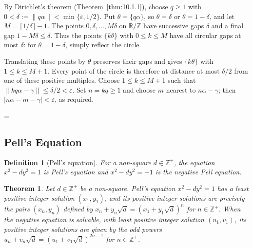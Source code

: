 \documentclass[11pt]{article}
\makeatletter
\theoremstyle{ntstyle}
\newtheorem{theorem}{Theorem}[subsection]
\newtheorem{definition}{Definition}[subsection]
\let\nt@closedisplay\]
\def\nt@guardedclose{\@ifnextchar\par{\nt@closeafterpar}{\@ifnextchar\end{\postdisplaypenalty\@M\nt@closedisplay}{\nt@closedisplay}}}
\def\nt@closeafterpar\par{\@ifnextchar\par{\nt@closeafterpar}{\@ifnextchar\end{\postdisplaypenalty\@M\nt@closedisplay\par}{\nt@closedisplay\par}}}
\renewenvironment{proof}[1][\proofname]{\par
  \pushQED{\qed}\normalfont\topsep\medskipamount\edef\nt@afterproof{\@endparpenalty=\the\@endparpenalty\relax}\@beginparpenalty\@M\@endparpenalty\@M\let\]\nt@guardedclose\trivlist\item[]\textit{#1\@addpunct{.}} \ignorespaces}{\ifvmode\addpenalty\@M\fi\popQED\nt@afterproof\endtrivlist\@endpefalse}
\makeatother
\begin{document}
\begin{proof} By Dirichlet's theorem (Theorem~\ref{thm:10.1.1}),
	choose $q\ge1$ with $0<\delta:=\lVert q\alpha\rVert<\min\{\varepsilon,1/2\}$.
	Put $\theta=\{q\alpha\}$, so $\theta=\delta$ or $\theta=1-\delta$,
	and let $M=\lceil1/\delta\rceil-1$.
	The points $0,\delta,\ldots,M\delta$ on $\mathbb{R}/\mathbb{Z}$
	have successive gaps $\delta$ and a final gap $1-M\delta\le\delta$.
	Thus the points $\{k\theta\}$ with $0\le k\le M$ have all circular gaps
	at most $\delta$: for $\theta=1-\delta$, simply reflect the circle.

	Translating these points by $\theta$ preserves their gaps and gives
	$\{k\theta\}$ with $1\le k\le M+1$. Every point of the circle is
	therefore at distance at most $\delta/2$ from one of these positive
	multiples. Choose $1\le k\le M+1$ such that
	$\lVert kq\alpha-\gamma\rVert\le\delta/2<\varepsilon$.
	Set $n=kq\ge1$ and choose $m$ nearest to $n\alpha-\gamma$; then
	$|n\alpha-m-\gamma|<\varepsilon$, as required.

\end{proof}
\subsection{Pell's Equation}

\begin{definition}[Pell's equation]\label{def:10.7.1} For a non-square
	$d\in\mathbb{Z}^+$, the equation $x^2-dy^2=1$ is Pell's equation and $x^2-dy^2=-1$
	is the negative Pell equation.

\end{definition}
\begin{theorem}\label{thm:10.7.1} Let $d\in\mathbb{Z}^+$ be a non-square.
	Pell's equation $x^2-dy^2=1$ has a least positive integer solution $(x_1,y_1)$,
	and its positive integer solutions are precisely the pairs $(x_n,y_n)$
	defined by
	$x_n+y_n\sqrt{d}=(x_1+y_1\sqrt{d})^{n}$ for $n\in\mathbb{Z}^+$.
	When the negative equation is solvable,
	with least positive integer solution $(u_1,v_1)$, its positive integer
	solutions are given by the odd powers $u_n+v_n\sqrt
		{d}=(u_1+v_1\sqrt{d})^{2n-1}$ for $n\in\mathbb{Z}^+$.

\end{theorem}
\end{document}
